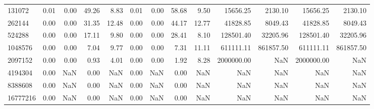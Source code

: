 \begin{tabular}{lrrrrrrrrrrrr}
131072 & 0.01 & 0.00 & 49.26 & 8.83 & 0.01 & 0.00 & 58.68 & 9.50 & 15656.25 & 2130.10 & 15656.25 & 2130.10 \\
262144 & 0.00 & 0.00 & 31.35 & 12.48 & 0.00 & 0.00 & 44.17 & 12.77 & 41828.85 & 8049.43 & 41828.85 & 8049.43 \\
524288 & 0.00 & 0.00 & 17.11 & 9.80 & 0.00 & 0.00 & 28.41 & 8.10 & 128501.40 & 32205.96 & 128501.40 & 32205.96 \\
1048576 & 0.00 & 0.00 & 7.04 & 9.77 & 0.00 & 0.00 & 7.31 & 11.11 & 611111.11 & 861857.50 & 611111.11 & 861857.50 \\
2097152 & 0.00 & 0.00 & 0.93 & 4.01 & 0.00 & 0.00 & 1.92 & 8.28 & 2000000.00 & NaN & 2000000.00 & NaN \\
4194304 & 0.00 & NaN & 0.00 & NaN & 0.00 & NaN & 0.00 & NaN & NaN & NaN & NaN & NaN \\
8388608 & 0.00 & NaN & 0.00 & NaN & 0.00 & NaN & 0.00 & NaN & NaN & NaN & NaN & NaN \\
16777216 & 0.00 & NaN & 0.00 & NaN & 0.00 & NaN & 0.00 & NaN & NaN & NaN & NaN & NaN \\
\bottomrule
\end{tabular}
